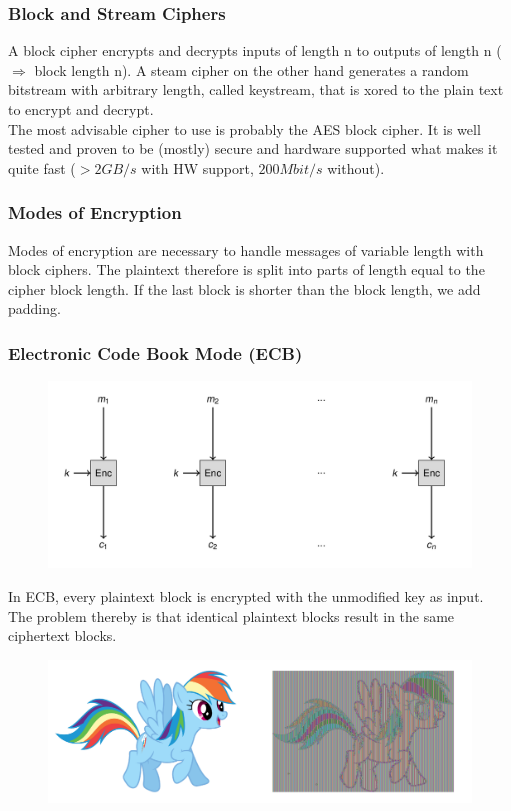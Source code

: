 \subsubsection{Block and Stream Ciphers}
A block cipher encrypts and decrypts inputs of length n to outputs of length n ($\Rightarrow$ block length n).
A steam cipher on the other hand generates a random bitstream with arbitrary length, called keystream, that is xored to the plain text to encrypt and decrypt.\\
The most advisable cipher to use is probably the AES block cipher.
It is well tested and proven to be (mostly) secure and hardware supported what makes it quite fast ($>2GB/s$ with HW support, $200Mbit/s$ without).

\subsubsection{Modes of Encryption}
Modes of encryption are necessary to handle messages of variable length with block ciphers.
The plaintext therefore is split into parts of length equal to the cipher block length.
If the last block is shorter than the block length, we add padding.

\subsubsection{Electronic Code Book Mode (ECB)}
\begin{figure}[H]
  \centering
  \includegraphics[width=.8\textwidth]{figures/ecb.png}
\end{figure}
In ECB, every plaintext block is encrypted with the unmodified key as input.
The problem thereby is that identical plaintext blocks result in the same ciphertext blocks.
\begin{figure}[H]
  \centering
  \includegraphics[width=.8\textwidth]{figures/ecb_problem.png}
\end{figure}

